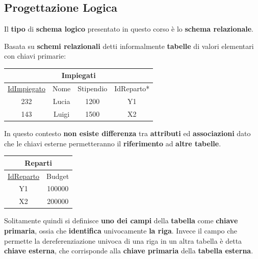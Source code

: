 \documentclass{article}
\begin{document}
\newpage

\subsection{Progettazione Logica}

Il \textbf{tipo} di \textbf{schema logico} presentato in questo corso è lo \textbf{schema relazionale}.

\vspace*{10px}

Basata su \textbf{schemi relazionali} detti informalmente \textbf{tabelle} di valori elementari con chiavi primarie:

\vspace*{5px}

\begin{center}
\begin{tabular}{ |c|c|c|c| }
    \hline
    \multicolumn{4}{|c|}{Impiegati} \\
    \hline
    \underline{IdImpiegato} & Nome & Stipendio & IdReparto* \\
    \hline
    232 & Lucia & 1200 & Y1 \\
    \hline
    143 & Luigi & 1500 & X2 \\
    \hline
\end{tabular}
\end{center}

\vspace*{5px}

In questo contesto \textbf{non esiste differenza} tra \textbf{attributi} ed \textbf{associazioni} dato che le chiavi
esterne permetteranno il \textbf{riferimento} ad \textbf{altre tabelle}.

\vspace*{5px}

\begin{center}
\begin{tabular}{ |c|c| }
    \hline
    \multicolumn{2}{|c|}{Reparti} \\
    \hline
    \underline{IdReparto} & Budget \\
    \hline
    Y1 & 100000 \\
    \hline
    X2 & 200000 \\
    \hline
\end{tabular}
\end{center}

\vspace*{5px}

Solitamente quindi si definisce \textbf{uno dei campi} della \textbf{tabella} come \textbf{chiave primaria}, ossia che \textbf{identifica} univocamente \textbf{la riga}. Invece il campo che permette la dereferenziazione univoca
di una riga in un altra tabella è detta \textbf{chiave esterna}, che corrisponde alla \textbf{chiave primaria} della \textbf{tabella esterna}.
\end{document}
